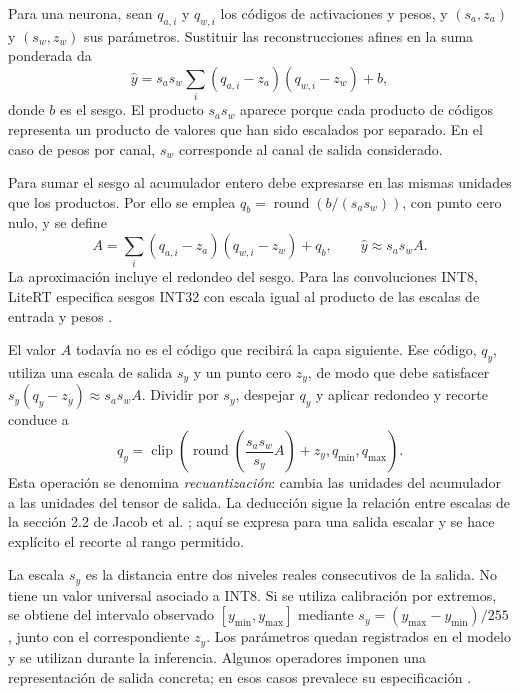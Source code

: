 Para una neurona, sean $q_{a,i}$ y $q_{w,i}$ los códigos de activaciones y pesos, y $(s_a,z_a)$ y $(s_w,z_w)$ sus parámetros. Sustituir las reconstrucciones afines en la suma ponderada da
\begin{equation}
\widehat y=s_as_w\sum_i(q_{a,i}-z_a)(q_{w,i}-z_w)+b,
\end{equation}
donde $b$ es el sesgo. El producto $s_as_w$ aparece porque cada producto de códigos representa un producto de valores que han sido escalados por separado. En el caso de pesos por canal, $s_w$ corresponde al canal de salida considerado.

Para sumar el sesgo al acumulador entero debe expresarse en las mismas unidades que los productos. Por ello se emplea $q_b=\operatorname{round}(b/(s_as_w))$, con punto cero nulo, y se define
\begin{equation}
A=\sum_i(q_{a,i}-z_a)(q_{w,i}-z_w)+q_b,
\qquad \widehat y\approx s_as_wA.
\label{eq:cap3_acumulador}
\end{equation}
La aproximación incluye el redondeo del sesgo. Para las convoluciones INT8, LiteRT especifica sesgos INT32 con escala igual al producto de las escalas de entrada y pesos \cite{litertspec}.

El valor $A$ todavía no es el código que recibirá la capa siguiente. Ese código, $q_y$, utiliza una escala de salida $s_y$ y un punto cero $z_y$, de modo que debe satisfacer $s_y(q_y-z_y)\approx s_as_wA$. Dividir por $s_y$, despejar $q_y$ y aplicar redondeo y recorte conduce a
\begin{equation}
q_y=\operatorname{clip}\!\left(
\operatorname{round}\!\left(\frac{s_as_w}{s_y}A\right)+z_y,
q_{\min},q_{\max}\right).
\label{eq:cap3_recuant}
\end{equation}
Esta operación se denomina \emph{recuantización}: cambia las unidades del acumulador a las unidades del tensor de salida. La deducción sigue la relación entre escalas de la sección 2.2 de Jacob et al. \cite{jacob2018}; aquí se expresa para una salida escalar y se hace explícito el recorte al rango permitido.

La escala $s_y$ es la distancia entre dos niveles reales consecutivos de la salida. No tiene un valor universal asociado a INT8. Si se utiliza calibración por extremos, se obtiene del intervalo observado $[y_{\min},y_{\max}]$ mediante $s_y=(y_{\max}-y_{\min})/255$, junto con el correspondiente $z_y$. Los parámetros quedan registrados en el modelo y se utilizan durante la inferencia. Algunos operadores imponen una representación de salida concreta; en esos casos prevalece su especificación \cite{litertptq,litertspec}.

